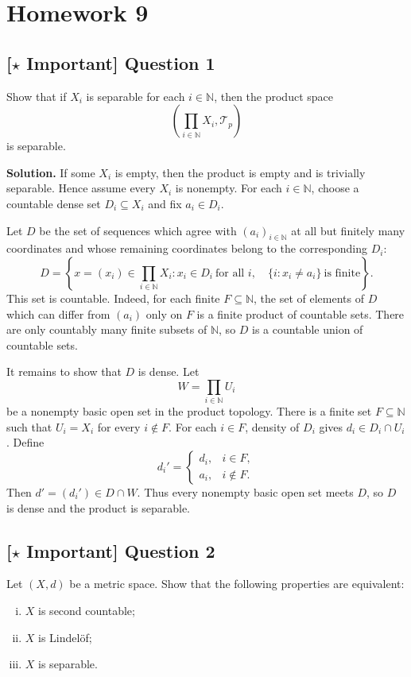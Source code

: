 \documentclass{article}
\newcommand{\N}{\mathbb{N}}
\newcommand{\important}{\texorpdfstring{\textbf{[\(\star\) Important]}}{[Important]}}
\newenvironment{solution}{\par\noindent\textbf{Solution.}\quad}{\par}
\begin{document}
\section{Homework 9}



\subsection{\important{} Question 1}

Show that if $X_i$ is separable for each $i\in\N$, then the product space
\[
  \left(\prod_{i\in\N}X_i,\mathcal{T}_p\right)
\]
is separable.

\begin{solution}
  If some $X_i$ is empty, then the product is empty and is trivially
  separable. Hence assume every $X_i$ is nonempty. For each $i\in\N$,
  choose a countable dense set $D_i\subseteq X_i$ and fix $a_i\in D_i$.

  Let $D$ be the set of sequences which agree with $(a_i)_{i\in\N}$ at
  all but finitely many coordinates and whose remaining coordinates belong
  to the corresponding $D_i$:
  \[
    D=\left\{x=(x_i)\in\prod_{i\in\N}X_i:
      x_i\in D_i\ \text{for all }i,\quad
    \{i:x_i\ne a_i\}\ \text{is finite}\right\}.
  \]
  This set is countable. Indeed, for each finite $F\subseteq\N$, the set
  of elements of $D$ which can differ from $(a_i)$ only on $F$ is a finite
  product of countable sets. There are only countably many finite subsets
  of $\N$, so $D$ is a countable union of countable sets.

  It remains to show that $D$ is dense. Let
  \[
    W=\prod_{i\in\N}U_i
  \]
  be a nonempty basic open set in the product topology. There is a finite
  set $F\subseteq\N$ such that $U_i=X_i$ for every $i\notin F$. For each
  $i\in F$, density of $D_i$ gives $d_i\in D_i\cap U_i$. Define
  \[
    d_i'=
    \begin{cases}
      d_i,&i\in F,\\
      a_i,&i\notin F.
    \end{cases}
  \]
  Then $d'=(d_i')\in D\cap W$. Thus every nonempty basic open set meets
  $D$, so $D$ is dense and the product is separable.
\end{solution}

\subsection{\important{} Question 2}

Let $(X,d)$ be a metric space. Show that the following properties are
equivalent:
\begin{enumerate}[(i)]
  \item $X$ is second countable;
  \item $X$ is Lindel\"of;
  \item $X$ is separable.
\end{enumerate}
\end{document}
